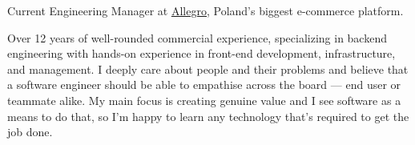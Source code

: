 

\begin{cvparagraph}

Current Engineering Manager at \href{https://allegro.pl}{\underline{Allegro}}, Poland's biggest e-commerce platform.

Over 12 years of well-rounded commercial experience, specializing in backend engineering with hands-on experience in front-end development, infrastructure, and management.
I deeply care about people and their problems and believe that a software engineer should be able to empathise across the board — end user or teammate alike.
My main focus is creating genuine value and I see software as a means to do that, so I'm happy to learn any technology that's required to get the job done.
\end{cvparagraph}
